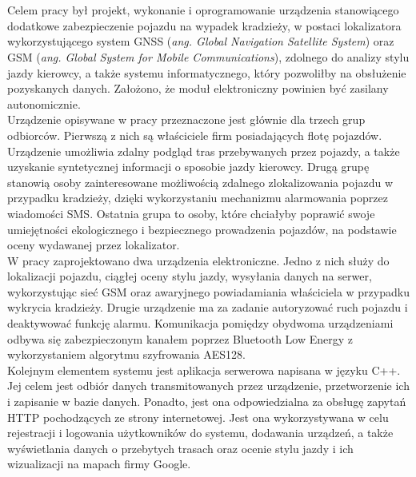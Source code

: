 \thispagestyle{empty}
\\

\\

\begin{singlespacing}

Celem pracy był projekt, wykonanie i oprogramowanie urządzenia stanowiącego dodatkowe zabezpieczenie pojazdu na wypadek kradzieży, w postaci lokalizatora wykorzystującego system GNSS (\textit{ang. Global Navigation Satellite System}) oraz GSM (\textit{ang. Global System for Mobile Communications}), zdolnego do analizy stylu jazdy kierowcy, a także systemu informatycznego, który pozwoliłby na obsłużenie pozyskanych danych. Założono, że moduł elektroniczny powinien być zasilany autonomicznie.\\

Urządzenie opisywane w pracy przeznaczone jest głównie dla trzech grup odbiorców. Pierwszą z nich są właściciele firm posiadających flotę pojazdów. Urządzenie umożliwia zdalny podgląd tras przebywanych przez pojazdy, a także uzyskanie syntetycznej informacji o sposobie jazdy kierowcy. Drugą grupę stanowią osoby zainteresowane możliwością zdalnego zlokalizowania pojazdu w przypadku kradzieży, dzięki wykorzystaniu mechanizmu alarmowania poprzez wiadomości SMS. Ostatnia grupa to osoby, które chciałyby poprawić swoje umiejętności ekologicznego i bezpiecznego prowadzenia pojazdów, na podstawie oceny wydawanej przez lokalizator. \\

W pracy zaprojektowano dwa urządzenia elektroniczne. Jedno z nich służy do lokalizacji pojazdu, ciągłej oceny stylu jazdy, wysyłania danych na serwer, wykorzystując sieć GSM oraz awaryjnego powiadamiania właściciela w przypadku wykrycia kradzieży. Drugie urządzenie ma za zadanie autoryzować ruch pojazdu i deaktywować funkcję alarmu. Komunikacja pomiędzy obydwoma urządzeniami odbywa się zabezpieczonym kanałem poprzez Bluetooth Low Energy z wykorzystaniem algorytmu szyfrowania AES128. \\

Kolejnym elementem systemu jest aplikacja serwerowa napisana w języku C++. Jej celem jest odbiór danych transmitowanych przez urządzenie, przetworzenie ich i zapisanie w bazie danych. Ponadto, jest ona odpowiedzialna za obsługę zapytań HTTP pochodzących ze strony internetowej. Jest ona wykorzystywana w celu rejestracji i logowania użytkowników do systemu, dodawania urządzeń, a także wyświetlania danych o przebytych trasach oraz ocenie stylu jazdy i ich wizualizacji na mapach firmy Google. \\


\end{singlespacing}
